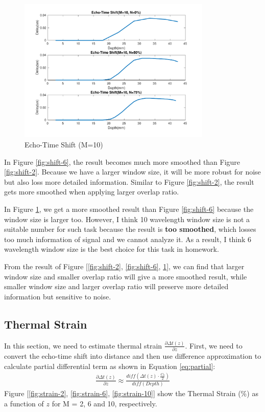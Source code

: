 \documentclass{article}
\begin{document}
\begin{figure}[H]
    \centering
    \includegraphics[width=0.82\textwidth]{src/shift_10.pdf}
    \caption{Echo-Time Shift (M=10)}
    \label{fig:shift-10}
\end{figure}

In Figure \ref{fig:shift-6}, the result becomes much more smoothed than Figure \ref{fig:shift-2}. Because we have a larger 
window size, it will be more robust for noise but also loss more detailed information. Similar to Figure \ref{fig:shift-2}, 
the result gets more smoothed when applying larger overlap ratio.

In Figure \ref{fig:shift-10}, we get a more smoothed result than Figure \ref{fig:shift-6} because the window size is larger too.
However, I think 10 wavelength window size is not a suitable number for such task because the result is \textbf{too smoothed},
which losses too much information of signal and we cannot analyze it. As a result, I think 6 wavelength window size is the best 
choice for this task in homework.

From the result of Figure [\ref{fig:shift-2}, \ref{fig:shift-6}, \ref{fig:shift-10}], we can find that larger window size and
smaller overlap ratio will give a more smoothed result, while smaller window size and larger overlap ratio will preserve 
more detailed information but sensitive to noise.
\subsection{Thermal Strain}
In this section, we need to estimate thermal strain $\frac{\partial \Delta t(z)}{\partial z}$. First, we need to convert the 
echo-time shift into distance and then use difference approximation to calculate partial differential term as shown in 
Equation \ref{eq:partial}:
\begin{align}
    \frac{\partial \Delta t(z)}{\partial z} \approx \frac{diff(\Delta t(z) \cdot \frac{C_0}{2})}{diff(Depth)}
    \label{eq:partial}
\end{align}
Figure [\ref{fig:strain-2}, \ref{fig:strain-6}, \ref{fig:strain-10}] show the Thermal Strain (\%) as a function of $z$ 
for M = 2, 6 and 10, respectively.
\end{document}
